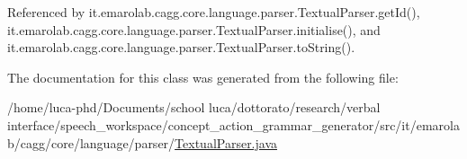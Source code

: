 Referenced by it.\-emarolab.\-cagg.\-core.\-language.\-parser.\-Textual\-Parser.\-get\-Id(), it.\-emarolab.\-cagg.\-core.\-language.\-parser.\-Textual\-Parser.\-initialise(), and it.\-emarolab.\-cagg.\-core.\-language.\-parser.\-Textual\-Parser.\-to\-String().



The documentation for this class was generated from the following file\-:\begin{DoxyCompactItemize}
\item 
/home/luca-\/phd/\-Documents/school luca/dottorato/research/verbal interface/speech\-\_\-workspace/concept\-\_\-action\-\_\-grammar\-\_\-generator/src/it/emarolab/cagg/core/language/parser/\hyperlink{TextualParser_8java}{Textual\-Parser.\-java}\end{DoxyCompactItemize}
